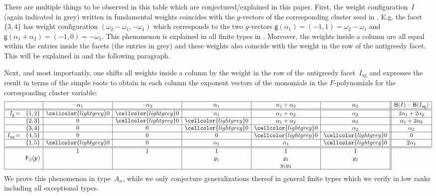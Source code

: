 \documentclass[ALCO,Unicode,ThmDefs]{cedram}
\newcommand{\lightgrey}{\cellcolor{lightgrey}}
\newcommand{\y}{\mathbf{y}}
\newcommand{\greedy}{I_{\operatorname{g}}}
\newcommand{\antigreedy}{I_{\operatorname{ag}}}
\newcommand{\Fpoly}[2]{{\mathsf{F}_{#1}(#2)}}
\newcommand{\Xvec}[2]{{\mathsf{#1}({#2})}}
\newcommand{\gvec}[1]{\Xvec{g}{#1}}
\newcommand{\sfB}{\mathsf{B}}
\newcommand{\brickVector}{\sfB}
\newcommand*{\Mk}{\mkern -2mu}
\begin{document}
\begin{exem}
There are multiple things to be observed in this table which are conjectured/explained in this paper. First, the weight configuration~$I$ (again indicated in grey) written in fundamental weights coincides with the $g$-vectors of the corresponding cluster seed in . E.g. the facet $\{3,4\}$ has weight configuration $(\omega_2-\omega_1,-\omega_1)$ which corresponds to the two $g$-vectors $\gvec{\alpha_1} = (-1,1) = \omega_2-\omega_1$ and $\gvec{\alpha_1+\alpha_2} = (-1,0) = -\omega_1$. This phenomenon is explained in all finite types in . Moreover, the weights inside a column are all equal within the entries inside the facets (the entries in grey) and these weights also coincide with the weight in the row of the antigreedy facet. This will be explained in  and the following paragraph.

Next, and most importantly, one shifts all weights inside a column by the weight in the row of the antigreedy facet~$\antigreedy$ and expresses the result in terms of the simple roots to obtain in each column the exponent vectors of the monomials in the $F$-polynomials for the corresponding cluster variable:
\[
\begin{array}{|rc|c|c|c|c|c||c|}\hline
&& -\alpha_1 & -\alpha_2 & \alpha_1 & \alpha_1+\alpha_2 & \alpha_2 & \brickVector(I) - \brickVector(\antigreedy) \\\hline\hline

\greedy  \Mk=\Mk &\{1,2\} & \lightgrey 0 & \lightgrey 0 & \alpha_1 & \alpha_1+\alpha_2 & \alpha_2 & 2\alpha_1+2\alpha_2 \\\hline &\{2,3\} & 0 & \lightgrey 0 & \lightgrey 0 & \alpha_1+\alpha_2 & \alpha_2 & \alpha_1+2\alpha_2 \\\hline &\{3,4\} & 0 & 0 & \lightgrey 0 & \lightgrey 0 & \alpha_2 & \alpha_2 \\\hline
\antigreedy \Mk=\Mk &\{4,5\} & 0 & 0 & 0 & \lightgrey 0 & \lightgrey 0 & 0
\\\hline &\{1,5\} & \lightgrey 0 & 0 & \alpha_1 & \alpha_1 & \lightgrey 0 & 2\alpha_1 \\\hline\hline & & 1 & 1 & 1 & 1 & 1 \\
& \Fpoly{\beta}{\y} & & & y_1 & y_1 & y_2 \\
& & & & & y_1y_2 & \\
\cline{1-7}
\end{array}
\]
We prove this phenomenon in type~$A_n$, while we only conjecture generalizations thereof in general finite types which we verify in low ranks including all exceptional types.


\end{exem}
\end{document}
